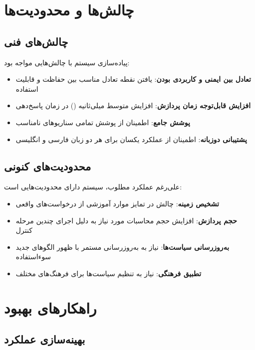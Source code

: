 \documentclass[11pt, a4paper, oneside]{book}
\begin{document}
	\section{چالش‌ها و محدودیت‌ها}

	\subsection{چالش‌های فنی}

	پیاده‌سازی سیستم  با چالش‌هایی مواجه بود:

	\begin{itemize}
		\item \textbf{تعادل بین ایمنی و کاربردی بودن}: یافتن نقطه تعادل مناسب بین حفاظت و قابلیت استفاده
		\item \textbf{افزایش قابل‌توجه زمان پردازش}: افزایش متوسط  میلی‌ثانیه () در زمان پاسخ‌دهی
		\item \textbf{پوشش جامع}: اطمینان از پوشش تمامی سناریوهای نامناسب
		\item \textbf{پشتیبانی دوزبانه}: اطمینان از عملکرد یکسان برای هر دو زبان فارسی و انگلیسی
	\end{itemize}

	\subsection{محدودیت‌های کنونی}

	علی‌رغم عملکرد مطلوب، سیستم دارای محدودیت‌هایی است:

	\begin{itemize}
		\item \textbf{تشخیص زمینه}: چالش در تمایز موارد آموزشی از درخواست‌های واقعی
		\item \textbf{حجم پردازش}: افزایش حجم محاسبات مورد نیاز به دلیل اجرای چندین مرحله کنترل
		\item \textbf{به‌روزرسانی سیاست‌ها}: نیاز به به‌روزرسانی مستمر با ظهور الگوهای جدید سوءاستفاده
		\item \textbf{تطبیق فرهنگی}: نیاز به تنظیم سیاست‌ها برای فرهنگ‌های مختلف
	\end{itemize}

	\section{راهکارهای بهبود}

	\subsection{بهینه‌سازی عملکرد}
\end{document}
